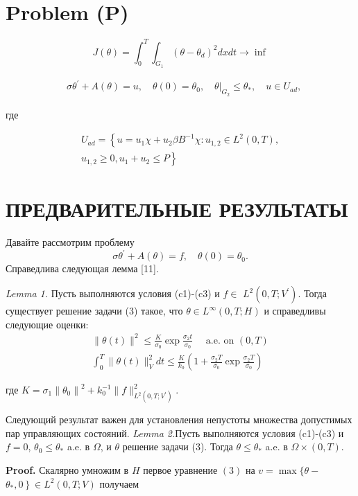 \section{Problem (P)}
\[
J(\theta)=\int_{0}^{T} \int_{G_{1}}\left(\theta-\theta_{d}\right)^{2} d x d t \rightarrow \inf
\]

\[
\begin{aligned}
& \sigma \theta^{\prime}+A(\theta)=u, \quad \theta(0)=\theta_{0},\left.\quad
\theta\right|_{G_{2}} \leq \theta_{*}, \quad u \in U_{a d},
\end{aligned}
\]

где

\[
\begin{array}{r}
U_{a d}=\left\{u=u_{1} \chi+u_{2} \beta B^{-1} \chi: u_{1,2} \in L^{2}(0, T),\right. \\
\left.u_{1,2} \geq 0, u_{1}+u_{2} \leq P\right\}
\end{array}
\]

\section{ПРЕДВАРИТЕЛЬНЫЕ РЕЗУЛЬТАТЫ}
Давайте рассмотрим проблему
\[
\sigma \theta^{\prime}+A(\theta)=f, \quad \theta(0)=\theta_{0} .
\]
Справедлива следующая лемма [11].

\textit{Lemma 1.}
Пусть выполняются условия (c1)-(c3) и $f \in$ $L^{2}\left(0, T ; V^{\prime}\right)$.
Тогда существует решение задачи (3) такое, что $\theta \in L^{\infty}(0, T ; H)$
и справедливы следующие оценки:
\[
\begin{gathered}
\|\theta(t)\|^{2} \leq \frac{K}{\sigma_{0}} \exp \frac{\sigma_{2} t}{\sigma_{0}}
\quad \text { a.e. on }(0, T) \\
\int_{0}^{T}\|\theta(t)\|_{V}^{2} d t \leq
\frac{K}{k_{0}}\left(1+\frac{\sigma_{2} T}{\sigma_{0}} \exp
\frac{\sigma_{2} T}{\sigma_{0}}\right)
\end{gathered}
\]

где $K=\sigma_{1}\left\|\theta_{0}\right\|^{2}+k_{0}^{-1}\|f\|_{L^{2}\left(0, T ; V^{\prime}\right)}^{2}$.

Следующий результат важен для установления непустоты множества допустимых пар управляющих состояний.
\textit{Lemma 2.}Пусть выполняются условия (c1)-(c3) и
$f=0$, $\theta_{0} \leq \theta_{*}$ a.e. в $\Omega$, и $\theta$ решение задачи (3).
Тогда $\theta \leq \theta_{*}$ a.e. в $\Omega \times(0, T)$.

\textbf{Proof.}
Скалярно умножим в $H$ первое уравнение $(3)$ на
$v=\max \{\theta-$ $\left.\theta_{*}, 0\right\} \in L^{2}(0, T ; V)$ получаем

